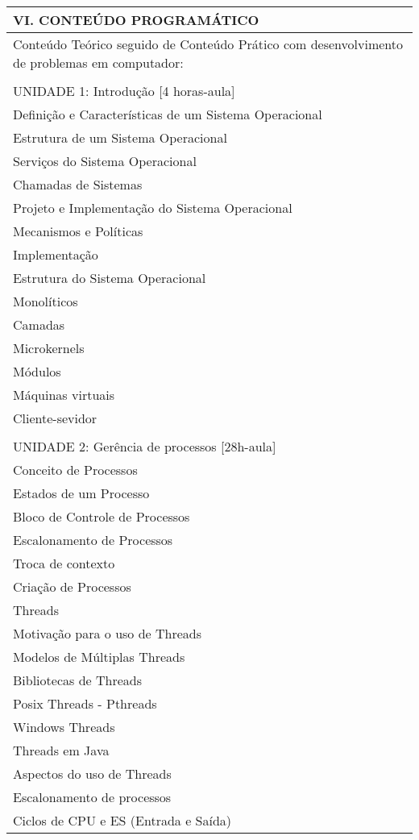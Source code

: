 \documentclass[12pt]{article}
\begin{document}
\begin{longtable}{|L{1.025\textwidth}|} \hline
%
{\bf VI. CONTEÚDO PROGRAMÁTICO } \\ \hline
Conteúdo Teórico seguido de Conteúdo Prático com desenvolvimento de problemas em computador: \\
\\
UNIDADE 1: Introdução [4 horas-aula]\\
Definição e Características de um Sistema Operacional\\
Estrutura de um Sistema Operacional\\
Serviços do Sistema Operacional\\
Chamadas de Sistemas\\
Projeto e Implementação do Sistema Operacional\\
Mecanismos e Políticas\\
Implementação\\
Estrutura do Sistema Operacional\\
Monolíticos\\
Camadas\\
Microkernels\\
Módulos\\
Máquinas virtuais\\
Cliente-sevidor\\
\\
UNIDADE 2: Gerência de processos [28h-aula]\\
Conceito de Processos\\
Estados de um Processo\\
Bloco de Controle de Processos\\
Escalonamento de Processos\\
Troca de contexto\\
Criação de Processos\\
Threads\\
Motivação para o uso de Threads\\
Modelos de Múltiplas Threads\\
Bibliotecas de Threads\\
Posix Threads - Pthreads\\
Windows Threads\\
Threads em Java\\
Aspectos do uso de Threads\\
Escalonamento de processos\\
Ciclos de CPU e ES (Entrada e Saída)\\

\end{longtable}
\end{document}
